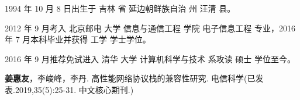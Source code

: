 \begin{resume}


  1994 年 10 月 8 日出生于 吉林 省 延边朝鲜族自治 州 汪清 县。

  2012 年 9 月考入 北京邮电 大学 信息与通信工程 学院 电子信息工程 专业，2016 年 7 月本科毕业并获得 工学 学士学位。

  2016 年 9 月推荐免试进入 清华 大学 计算机科学与技术 系攻读 硕士 学位至今。


  \begin{publications}
  
  \end{publications}

  \begin{publications}[before=\publicationskip,after=\publicationskip]
    \item \textbf{姜惠友}，李峻峰，李丹. 高性能网络协议栈的兼容性研究. 电信科学(已发表.2019,35(5):25-31. 中文核心期刊.)
  \end{publications}

  \begin{publications}
  \end{publications}

\end{resume}
